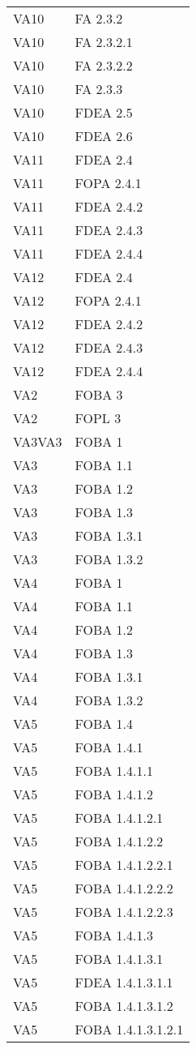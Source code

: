 \begin{longtable}{XX}
VA10&FA 2.3.2\\ 
VA10&FA 2.3.2.1\\ 
VA10&FA 2.3.2.2\\ 
VA10&FA 2.3.3\\ 
VA10&FDEA 2.5\\ 
VA10&FDEA 2.6\\ 
\midrule 
VA11&FDEA 2.4\\ 
VA11&FOPA 2.4.1\\ 
VA11&FDEA 2.4.2\\ 
VA11&FDEA 2.4.3\\ 
VA11&FDEA 2.4.4\\ 
\midrule 
VA12&FDEA 2.4\\ 
VA12&FOPA 2.4.1\\ 
VA12&FDEA 2.4.2\\ 
VA12&FDEA 2.4.3\\ 
VA12&FDEA 2.4.4\\ 
\midrule 
VA2&FOBA 3\\ 
VA2&FOPL 3\\ 
\midrule 
VA3VA3&FOBA 1\\ 
VA3&FOBA 1.1\\ 
VA3&FOBA 1.2\\ 
VA3&FOBA 1.3\\ 
VA3&FOBA 1.3.1\\ 
VA3&FOBA 1.3.2\\ 
\midrule 
VA4&FOBA 1\\ 
VA4&FOBA 1.1\\ 
VA4&FOBA 1.2\\ 
VA4&FOBA 1.3\\ 
VA4&FOBA 1.3.1\\ 
VA4&FOBA 1.3.2\\ 
\midrule 
VA5&FOBA 1.4\\ 
VA5&FOBA 1.4.1\\ 
VA5&FOBA 1.4.1.1\\ 
VA5&FOBA 1.4.1.2\\ 
VA5&FOBA 1.4.1.2.1\\ 
VA5&FOBA 1.4.1.2.2\\ 
VA5&FOBA 1.4.1.2.2.1\\ 
VA5&FOBA 1.4.1.2.2.2\\ 
VA5&FOBA 1.4.1.2.2.3\\ 
VA5&FOBA 1.4.1.3\\ 
VA5&FOBA 1.4.1.3.1\\ 
VA5&FDEA 1.4.1.3.1.1\\ 
VA5&FOBA 1.4.1.3.1.2\\ 
VA5&FOBA 1.4.1.3.1.2.1\\ 

\end{longtable}
